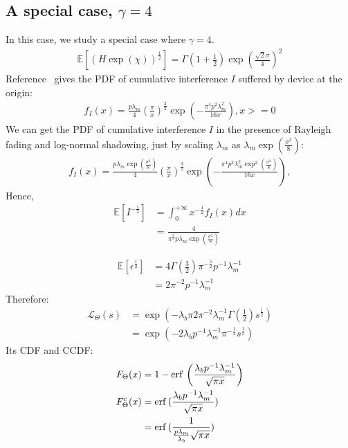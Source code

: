 \subsection{A special case, $\gamma=4$}
In this case, we study a special case where $\gamma=4$.
\begin{align}
	\mathbb{E}\left[ \left( H \exp(\chi)\right)  ^{\frac{1}{2}} \right]  = \Gamma(1+\frac{1}{2}) \exp \left( \frac{\sqrt{2}\sigma}{4}\right) ^2
\end{align}
Reference~\cite{haenggi2009interference} gives the PDF of cumulative interference $I$ suffered by device at the origin:
\begin{align}
	f_{I}(x) = \frac{p\lambda_{m}}{4} (\frac{\pi}{x})^{\frac{3}{2}} \exp(-\frac{\pi^4 p^2\lambda_{m}^2}{16x}), x >= 0
\end{align}
We can get the PDF of cumulative interference $I$ in the presence of Rayleigh fading and log-normal shadowing, just by scaling $\lambda_{m}$ as $ \lambda_{m} \exp(\frac{\sigma^2}{8})$:
\begin{align}
	f_{I}(x) = \frac{    p\lambda_{m}   \exp(\frac{\sigma^2}{8})  }{4} (\frac{\pi}{x})^{\frac{3}{2}} \exp(    -\frac{    \pi^4    p^2\lambda_{m}^2     \exp^2(\frac{\sigma^2}{8})    }{    16x    }    ), 
\end{align} 
Hence,
\begin{align}
	\mathbb{E}\left[ I ^{-\frac{1}{2}}\right] &= \int_{0}^{+\infty} x^{-\frac{1}{2}} f_{I}(x) dx \nonumber\\
	&= \frac{4}{    \pi^{\frac{5}{2}}  p\lambda_{m} \exp(\frac{\sigma^2}{8}) }
\end{align}

\begin{align}
	\mathbb{E}\left[ \epsilon ^{\frac{1}{2}} \right] & = 4\Gamma(\frac{3}{2})\pi^{-\frac{5}{2}} p^{-1}\lambda_{m}^{-1}\nonumber\\
	&=2\pi^{-2} p^{-1}\lambda_{m}^{-1}
\end{align}
Therefore:
\begin{align}
	\mathcal{L}_{\Theta}\left( s \right) &= \exp(-\lambda_{b} \pi 2\pi^{-2}\lambda_{m}^{-1} \Gamma(\frac{1}{2}) s^{\frac{1}{2}}) \nonumber \\
	&= \exp(-2\lambda_{b} p^{-1}\lambda_{m}^{-1}\pi^{-\frac{1}{2}}  s^{\frac{1}{2}}) 
\end{align}
Its CDF and CCDF:
\begin{align}
	F_{\Theta} (x) &=1 -\mathrm{erf}\, \left( 
	\frac{\lambda_{b}p^{-1}\lambda_{m}^{-1}}{\sqrt{\pi x}}
	\right) \\
	F^c_{\Theta} (x) &=\mathrm{erf}\,(\frac{\lambda_{b} p^{-1}\lambda_{m}^{-1}}{\sqrt{\pi x}}) \nonumber\\
	&= \mathrm{erf}\,(\frac{1}{\frac{p\lambda_{m}}{\lambda_{b}}\sqrt{\pi x}})
\end{align}

